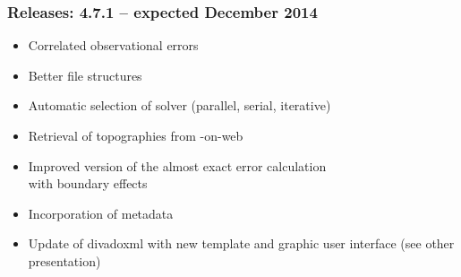 \begin{frame}[t]
\frametitle{Releases: 4.7.1 -- expected December 2014}



\begin{itemize}
\item<2-> Correlated observational errors
\item<3-> Better file structures\\
\item<4-> Automatic selection of solver (parallel, serial, iterative)\\
\item<5-> Retrieval of topographies from \diva-on-web 
\item<6-> Improved version of the almost exact error calculation\\
 with boundary effects
\item<7-> Incorporation of metadata \\
\item<8-> Update of divadoxml with new template and graphic user interface (see other presentation)
\end{itemize}

\end{frame}


